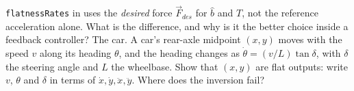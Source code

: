 \begin{exercises}
\exercise[2] \texttt{flatnessRates} in  uses the \emph{desired} force $\vec F_{des}$ for $\hat b$ and $T$, not the reference acceleration alone. What is the difference, and why is it the better choice inside a feedback controller?
\exercise[3] The car. A car's rear-axle midpoint $(x, y)$ moves with the speed $v$ along its heading $\theta$, and the heading changes as $\dot\theta = (v/L)\tan\delta$, with $\delta$ the steering angle and $L$ the wheelbase. Show that $(x, y)$ are flat outputs: write $v$, $\theta$ and $\delta$ in terms of $\dot x, \dot y, \ddot x, \ddot y$. Where does the inversion fail?
\end{exercises}
